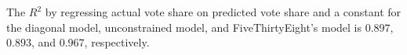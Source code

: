 The $R^2$ by regressing actual vote share on predicted vote share             and a constant for the diagonal model, unconstrained model, and FiveThirtyEight's            model is $0.897$, $0.893$, and $0.967$, respectively.%